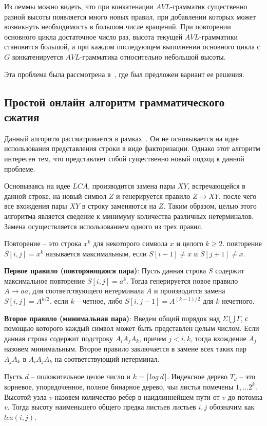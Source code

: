 \documentclass[12pt,a4paper]{extarticle}
\theoremstyle{break}
\begin{document}
Из леммы можно видеть, что при конкатенации $AVL$-грамматик существенно разной
высоты появляется много новых правил, при добавлении которых может возникнуть
необходимость в большом числе вращений. При повторении основного цикла
достаточное число раз, высота текущей $AVL$-грамматики становится большой, а при
каждом последующем выполнении основного цикла с $G$ конкатенируется
$AVL$-грамматика относительно небольшой высоты.

Эта проблема была рассмотрена в~\cite{slp}, где был предложен вариант ее
решения.

\newpage
\subsection{Простой онлайн алгоритм грамматического сжатия}
Данный алгоритм рассматривается в рамках~\cite{lca}. Он не основывается на идее
использования представления строки в виде факторизации. Однако этот алгоритм
интересен тем, что представляет собой существенно новый подход к данной
проблеме.

Основываясь на идее $LCA$, производится замена пары $XY$,
встречающейся в данной строке, на новый символ $Z$ и генерируется правило $Z \rightarrow XY$, после
чего все вхождения пары $XY$ в строку заменяются на $Z$. Таким образом, целью этого
алгоритма является сведение к минимуму количества различных нетерминалов.
Замена осуществляется использованием одного из трех правил.

Повторение -- это строка $x^k$ для некоторого символа $x$ и целого $k \geq 2$.
повторение $S[i,j] = x^k$ называется максимальным, если $S[i-1] \neq x$ и
$S[j+1] \neq x$.

\textbf{Первое правило (повторяющаяся пара)}: Пусть данная строка $S$ содержит
максимальное повторение $S[i,j] = a^k$. Тогда генерируется новое правило $A
\rightarrow aa$, для соответствующего нетерминала $A$ и производится замена
$S[i,j] = A^{k/2}$, если $k$ -- четное, либо $S[i,j-1] = A^{(k-1)/2}$ для
$k$ нечетного. 

\textbf{Второе правило (минимальная пара)}: Введем общий порядок над $\Sigma
\bigcup \Gamma$, с помощью которого каждый символ может быть представлен целым
числом. Если данная строка содержит подстроку $A_iA_jA_k$, причем $j < i, k$,
тогда вхождение $A_j$ назовем минимальным. Второе правило заключается в замене
всех таких пар $A_jA_k$ в $A_iA_jA_k$ на соответствующий нетерминал.

Пусть $d$ -- положительное целое число и $k = \lceil log\ d\rceil$. Индексное
дерево $T_d$ -- это корневое, упорядоченное, полное бинарное дерево, чьи листья
помечены $1,\ldots2^k$. Высотой узла $v$ назовем количество ребер в
наидлиннейшем пути от $v$ до потомка $v$. Тогда высоту наименьшего общего
предка листьев листьев $i, j$ обозначим как $lca(i,j)$.
\end{document}
